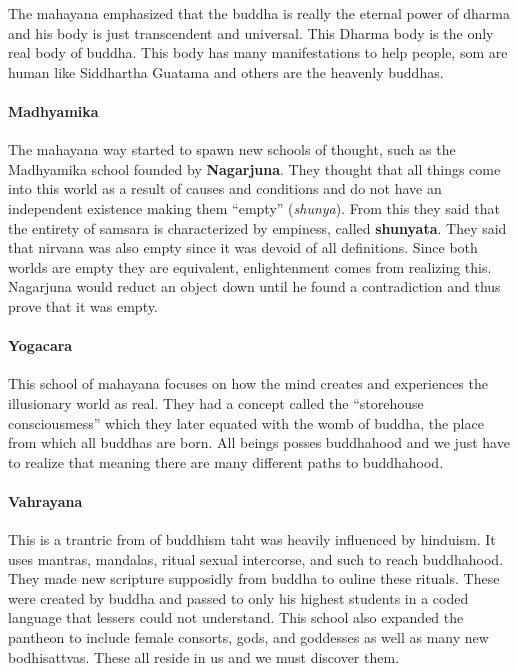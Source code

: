 \documentclass{article}
\begin{document}
The mahayana emphasized that the buddha is really the eternal power of dharma and his body is just transcendent and universal. This Dharma body is the only real body of buddha. This body has many manifestations to help people, som are human like Siddhartha Guatama and others are the heavenly buddhas.

\paragraph{Madhyamika}
\label{par:madhyamika}
The mahayana way started to spawn new schools of thought, such as the Madhyamika school founded by \textbf{Nagarjuna}. They thought that all things come into this world as a result of causes and conditions and do not have an independent existence making them ``empty'' (\emph{shunya}). From this they said that the entirety of samsara is characterized by empiness, called \textbf{shunyata}. They said that nirvana was also empty since it was devoid of all definitions. Since both worlds are empty they are equivalent, enlightenment comes from realizing this. Nagarjuna would reduct an object down until he found a contradiction and thus prove that it was empty.

\paragraph{Yogacara}
\label{par:yogacara}
This school of mahayana focuses on how the mind creates and experiences the illusionary world as real. They had a concept called the ``storehouse consciousmess'' which they later equated with the womb of buddha, the place from which all buddhas are born. All beings posses buddhahood and we just have to realize that meaning there are many different paths to buddhahood.

\paragraph{Vahrayana}
\label{par:vahrayana}
This is a trantric from of buddhism taht was heavily influenced by hinduism. It uses mantras, mandalas, ritual sexual intercorse, and such to reach buddhahood. They made new scripture supposidly from buddha to ouline these rituals. These were created by buddha and passed to only his highest students in a coded language that lessers could not understand. This school also expanded the pantheon to include female consorts, gods, and goddesses  as well as many new bodhisattvas. These all reside in us and we must discover them.
\end{document}
